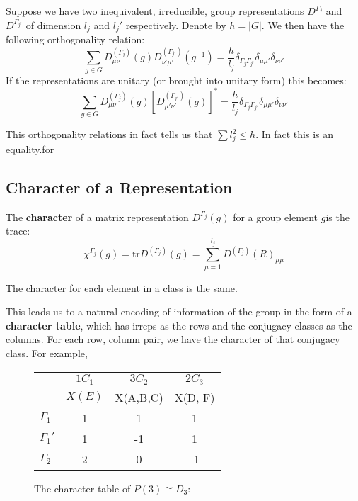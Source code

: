 \documentclass[9pt]{article}
\begin{document}
\begin{multicols}{2}
\begin{theorem}
    Suppose we have two inequivalent, irreducible, group representations $D^{\Gamma_j}$ and 
    $D^{\Gamma_{j'}}$ of dimension $l_j$ and $l_j'$ 
    respectively. Denote by $h=|G|$. We then have the following orthogonality relation: 
    \begin{equation}
        \sum_{g \in G}D_{\mu\nu}^{(\Gamma_{j})}(g)D_{\nu'\mu'}^{(\Gamma_{j'})}(g^{-1}) = \frac{h}{l_j}
        \delta_{\Gamma_j\Gamma_{j'}}\delta_{\mu\mu'}\delta_{\nu\nu'}
    \end{equation}
    If the representations are unitary (or brought into unitary form) this becomes:
    \begin{equation}
        \sum_{g \in G}D_{\mu\nu}^{(\Gamma_{j})}(g)[D_{\mu'\nu'}^{(\Gamma_{j'})}(g)]^* = \frac{h}{l_j}
    \delta_{\Gamma_j\Gamma_{j'}}\delta_{\mu\mu'}\delta_{\nu\nu'}
    \end{equation}
\end{theorem}
This orthogonality relations in fact tells us that $\sum l_j^2 \le h$. In fact this is an equality.for 

\subsection{Character of a Representation}

The \textbf{character} of a matrix representation $D^{\Gamma_j}(g)$
for a group element $g$is the trace:
$$\chi^{\Gamma_j}(g)=\text{tr} D^{(\Gamma_j)}(g)= \sum_{\mu=1}^{l_j}D^{(\Gamma_j)}(R)_{\mu\mu} $$

\begin{theorem}
    The character for each element in a class is the same.
\end{theorem}

This leads us to a natural encoding of information of the group in
the form of a \textbf{character table}, which has irreps as the
rows and the conjugacy classes as the columns. For each row, column
pair, we have the character of that conjugacy class. For example, 

\begin{figure}[H]
    \centering
    \begin{tabular}{lccc}
    \toprule
     & $1C_1$ & $3C_2$ & $2C_3$ \\
     & $X(E)$ & X(A,B,C) & X(D, F) \\
    \midrule
    $\Gamma_1$  & 1 &  1 &  1 \\
    $\Gamma_1'$ & 1 & -1 &  1 \\
    $\Gamma_2$  & 2 &  0 & -1 \\
    \bottomrule
    \end{tabular}
    \caption{The character table of $P(3) \cong D_3$:}
    \label{fig:1}
\end{figure}


\end{multicols}
\end{document}

